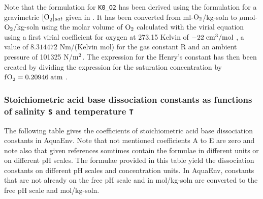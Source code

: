 \documentclass[a4paper]{article}
\begin{document}
\noindent
Note that the formulation for \texttt{K0\_O2} has been derived using the formulation for a gravimetric $[\ce{O_2}]_{sat}$ given in \citet[Weiss, 1970]{Weiss1970}. It has been converted from ml-$\rm O_2$/kg-soln to $\mu$mol-$\rm O_2$/kg-soln using the molar volume of $\rm O_2$ calculated with the virial equation using a first virial coefficient for oxygen at 273.15 Kelvin of $\rm -22 \; cm^3/mol$ \citet{Atkins1996}, a value of $8.314472$ Nm/(Kelvin mol) for the gas constant R and an ambient pressure of 101325 N/$\rm m^2$. The expression for the Henry's constant has then been created by dividing the expression for the saturation concentration by $\rm f\ce{O_2} = 0.20946 \;atm$ \citep{Williams2004}.


\subsubsection{Stoichiometric acid base dissociation constants as functions of salinity \texttt{S} and temperature \texttt{T}}
The following table gives the coefficients of stoichiometric acid base dissociation constants in \textsf{AquaEnv}.  Note that not mentioned coefficients A to E are zero and note also that given references somtimes contain the formulae in different units or on different pH scales. The formulae provided in this table yield the dissociation constants on different pH scales and concentration units. In \textsf{AquaEnv}, constants that are not already on the free pH scale and in mol/kg-soln are converted to the free pH scale and mol/kg-soln.

\end{document}
